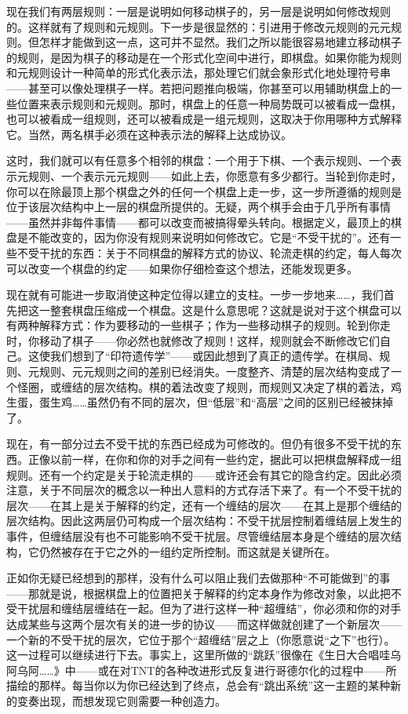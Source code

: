 现在我们有两层规则：一层是说明如何移动棋子的，另一层是说明如何修改规则的。这样就有了规则和元规则。下一步是很显然的：引进用于修改元规则的元元规则。但怎样才能做到这一点，这可并不显然。我们之所以能很容易地建立移动棋子的规则，是因为棋子的移动是在一个形式化空间中进行，即棋盘。如果你能为规则和元规则设计一种简单的形式化表示法，那处理它们就会象形式化地处理符号串——甚至可以像处理棋子一样。若把问题推向极端，你甚至可以用辅助棋盘上的一些位置来表示规则和元规则。那时，棋盘上的任意一种局势既可以被看成一盘棋，也可以被看成一组规则，还可以被看成是一组元规则，这取决于你用哪种方式解释它。当然，两名棋手必须在这种表示法的解释上达成协议。

这时，我们就可以有任意多个相邻的棋盘：一个用于下棋、一个表示规则、一个表示元规则、一个表示元元规则——如此上去，你愿意有多少都行。当轮到你走时，你可以在除最顶上那个棋盘之外的任何一个棋盘上走一步，这一步所遵循的规则是位于该层次结构中上一层的棋盘所提供的。无疑，两个棋手会由于几乎所有事情——虽然并非每件事情——都可以改变而被搞得晕头转向。根据定义，最顶上的棋盘是不能改变的，因为你没有规则来说明如何修改它。它是“不受干扰的”。还有一些不受干扰的东西：关于不同棋盘的解释方式的协议、轮流走棋的约定，每人每次可以改变一个棋盘的约定——如果你仔细检查这个想法，还能发现更多。

现在就有可能进一步取消使这种定位得以建立的支柱。一步一步地来……，我们首先把这一整套棋盘压缩成一个棋盘。这是什么意思呢？这就是说对于这个棋盘可以有两种解释方式：作为要移动的一些棋子；作为一些移动棋子的规则。轮到你走时，你移动了棋子——你必然也就修改了规则！这样，规则就会不断修改它们自己。这使我们想到了“印符遗传学”——或因此想到了真正的遗传学。在棋局、规则、元规则、元元规则之间的差别已经消失。一度整齐、清楚的层次结构变成了一个怪圈，或缠结的层次结构。棋的着法改变了规则，而规则又决定了棋的着法，鸡生蛋，蛋生鸡……虽然仍有不同的层次，但“低层”和“高层”之间的区别已经被抹掉了。

现在，有一部分过去不受干扰的东西已经成为可修改的。但仍有很多不受干扰的东西。正像以前一样，在你和你的对手之间有一些约定，据此可以把棋盘解释成一组规则。还有一个约定是关于轮流走棋的——或许还会有其它的隐含约定。因此必须注意，关于不同层次的概念以一种出人意料的方式存活下来了。有一个不受干扰的层次——在其上是关于解释的约定，还有一个缠结的层次——在其上是那个缠结的层次结构。因此这两层仍可构成一个层次结构：不受干扰层控制着缠结层上发生的事件，但缠结层没有也不可能影响不受干扰层。尽管缠结层本身是个缠结的层次结构，它仍然被存在于它之外的一组约定所控制。而这就是关键所在。

正如你无疑已经想到的那样，没有什么可以阻止我们去做那种“不可能做到”的事——那就是说，根据棋盘上的位置把关于解释的约定本身作为修改对象，以此把不受干扰层和缠结层缠结在一起。但为了进行这样一种“超缠结”，你必须和你的对手达成某些与这两个层次有关的进一步的协议——而这样做就创建了一个新层次——一个新的不受干扰的层次，它位于那个“超缠结”层之上（你愿意说“之下”也行）。这一过程可以继续进行下去。事实上，这里所做的“跳跃”很像在《生日大合唱哇乌阿乌阿……》中——或在对TNT的各种改进形式反复进行哥德尔化的过程中——所描绘的那样。每当你以为你已经达到了终点，总会有“跳出系统”这一主题的某种新的变奏出现，而想发现它则需要一种创造力。

